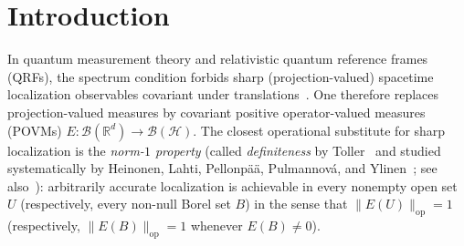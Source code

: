\documentclass[11pt,a4paper]{article}
\theoremstyle{definition}
\theoremstyle{remark}
\newcommand{\HH}{\mathcal{H}}
\newcommand{\tH}{\widetilde{\mathcal{H}}}
\newcommand{\BB}{\mathcal{B}}
\newcommand{\Bor}{\mathcal{B}}
\newcommand{\RR}{\mathbb{R}}
\newcommand{\op}{\mathrm{op}}
\newcommand{\bra}[1]{\langle #1|}
\newcommand{\norm}[1]{\|#1\|}
\begin{document}
\begin{abstract}
Third, we establish an operator-norm sharpening of the bounded-density obstruction, a four-line Logvinenko--Sereda--Kovrijkine obstruction yielding a sharp $0$--$1$ Borel dichotomy in the scalar isometric case that breaks down already at $\dim\tH=2$, and explicit normalized examples separating every regime. Finally, for relativistic QFT we prove a bounded-mass-band no-go bound $|S\cap Q_L(p)|/|Q_L(p)| \le (m_2-m_1)/L$ (best possible uniformly in $m_1,m_2$) and, combining Kaiser's exact $2+1$D $n$-body phase-space formula~\cite{Kaiser2025} with a general rescaled monotonicity lemma for all $d\ge 3, n\ge 2$, establish a complete scaling-dimension classification of free massive scalar Wick-power frames $:\!\phi(x)^n\!:$ in $d=1+s\ge 3$ dimensions: there exists $c>0$ for which pointwise $c\bra{\Omega}:\!\phi(x)^n\!:$ yields a globally bounded Poincar\'e-covariant definite frame if and only if $n(d-2)=d$, i.e.\ $(d,n)\in\{(1+3,2),\,(1+2,3)\}$, whereas subcritical $(1+2,2)$ sits in the unbounded-$h$, $\beta=0$ intermediate regime (with $\Lambda_\infty=1$ at $c=2\sqrt{m}$ and $\Lambda_\infty=c/(2\sqrt{m})<1$ for $0<c<2\sqrt{m}$) and all supercritical pairs are UV-unbounded.
\end{abstract}

\section{Introduction}
\label{sec:intro}

In quantum measurement theory and relativistic quantum reference frames (QRFs), the spectrum condition forbids sharp (projection-valued) spacetime localization observables covariant under translations~\cite{Wightman1962,Giannitrapani1998,Toller1999,FewsterLoveridge2026}. One therefore replaces projection-valued measures by covariant positive operator-valued measures (POVMs) $E:\Bor(\RR^d)\to\BB(\HH)$. The closest operational substitute for sharp localization is the \emph{norm-$1$ property} (called \emph{definiteness} by Toller~\cite{Toller1999} and studied systematically by Heinonen, Lahti, Pellonp\"a\"a, Pulmannov\'a, and Ylinen~\cite{Heinonen2003}; see also~\cite{BLPY2016}): arbitrarily accurate localization is achievable in every nonempty open set $U$ (respectively, every non-null Borel set $B$) in the sense that $\norm{E(U)}_{\op}=1$ (respectively, $\norm{E(B)}_{\op}=1$ whenever $E(B)\neq 0$).
\end{document}
